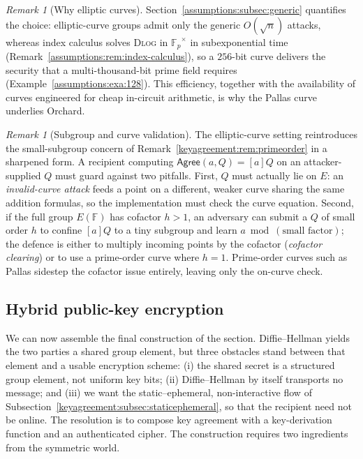 \documentclass[11pt,a4paper]{article}
\theoremstyle{definition}
\theoremstyle{remark}
\newtheorem{remark}[theorem]{Remark}
\newcommand{\F}{\ensuremath{\mathbb{F}}}
\newcommand{\Fp}{\ensuremath{\mathbb{F}_{p}}}
\begin{document}
\begin{remark}[Why elliptic curves]\label{keyagreement:rem:why-ec}
Section~\ref{assumptions:subsec:generic} quantifies the choice: elliptic-curve groups admit only the generic \(O(\sqrt{n})\) attacks, whereas index calculus solves \textsc{Dlog} in \(\Fp^\times\) in subexponential time (Remark~\ref{assumptions:rem:index-calculus}), so a \(256\)-bit curve delivers the security that a multi-thousand-bit prime field requires (Example~\ref{assumptions:exa:128}). This efficiency, together with the availability of curves engineered for cheap in-circuit arithmetic, is why the Pallas curve underlies Orchard.
\end{remark}

\begin{remark}[Subgroup and curve validation]\label{keyagreement:rem:ec-validation}
The elliptic-curve setting reintroduces the small-subgroup concern of Remark~\ref{keyagreement:rem:primeorder} in a sharpened form. A recipient computing \(\mathsf{Agree}(a, Q) = [a]Q\) on an attacker-supplied \(Q\) must guard against two pitfalls. First, \(Q\) must actually lie on \(E\): an \emph{invalid-curve attack} feeds a point on a different, weaker curve sharing the same addition formulas, so the implementation must check the curve equation. Second, if the full group \(E(\F)\) has cofactor \(h > 1\), an adversary can submit a \(Q\) of small order \(h\) to confine \([a]Q\) to a tiny subgroup and learn \(a \bmod (\text{small factor})\); the defence is either to multiply incoming points by the cofactor (\emph{cofactor clearing}) or to use a prime-order curve where \(h = 1\). Prime-order curves such as Pallas sidestep the cofactor issue entirely, leaving only the on-curve check.
\end{remark}

\subsection{Hybrid public-key encryption}\label{keyagreement:subsec:hpke}

We can now assemble the final construction of the section. Diffie--Hellman yields the two parties a shared group element, but three obstacles stand between that element and a usable encryption scheme: (i) the shared secret is a structured group element, not uniform key bits; (ii) Diffie--Hellman by itself transports no message; and (iii) we want the static--ephemeral, non-interactive flow of Subsection~\ref{keyagreement:subsec:staticephemeral}, so that the recipient need not be online. The resolution is to compose key agreement with a key-derivation function and an authenticated cipher. The construction requires two ingredients from the symmetric world.
\end{document}
